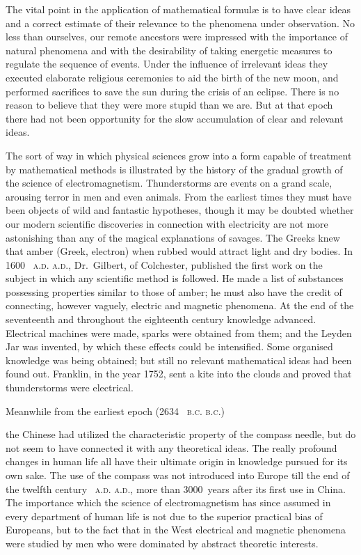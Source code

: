 \documentclass[12pt,leqno]{book}[2005/09/16]
\makeatletter
\newcommand{\PageSep}[1]{\ignorespaces}
\newcommand{\SCAbbrev}[3]{%
  \ifthenelse{\equal{#3}{.}}%
  {\textsc{\MakeLowercase{#1.#2}.}}%
  {\textsc{\MakeLowercase{#1.#2}.}\@#3}%
}
\newcommand{\AD}[1]{\SCAbbrev{A}{D}{#1}}
\newcommand{\BC}[1]{\SCAbbrev{B}{C}{#1}}
\makeatother
\begin{document}
The vital point in the application of mathematical
formulæ is to have clear ideas and a
correct estimate of their relevance to the
phenomena under observation. No less than
ourselves, our remote ancestors were impressed
with the importance of natural
phenomena and with the desirability of taking
energetic measures to regulate the sequence
of events. Under the influence of irrelevant
ideas they executed elaborate religious ceremonies
to aid the birth of the new moon, and
performed sacrifices to save the sun during
the crisis of an eclipse. There is no reason to
believe that they were more stupid than we
are. But at that epoch there had not been
opportunity for the slow accumulation of
clear and relevant ideas.

The sort of way in which physical sciences
%
grow into a form capable of treatment by
mathematical methods is illustrated by the
history of the gradual growth of the science
of electromagnetism. Thunderstorms are
events on a grand scale, arousing terror in
men and even animals. From the earliest
times they must have been objects of wild
\PageSep{32}
%
and fantastic hypotheses, though it may be
doubted whether our modern scientific discoveries
in connection with electricity are not
more astonishing than any of the magical
explanations of savages. The Greeks knew
that amber (Greek, electron) when rubbed
would attract light and dry bodies. In
1600~\AD, Dr.~Gilbert, of Colchester, published
%
the first work on the subject in which any
scientific method is followed. He made a
list of substances possessing properties similar
to those of amber; he must also have the
credit of connecting, however vaguely, electric
and magnetic phenomena. At the end of the
seventeenth and throughout the eighteenth
century knowledge advanced. Electrical
machines were made, sparks were obtained
from them; and the Leyden Jar was invented,
by which these effects could be intensified.
Some organised knowledge was
being obtained; but still no relevant mathematical
ideas had been found out. Franklin,
%
in the year 1752, sent a kite into the clouds
and proved that thunderstorms were electrical.

Meanwhile from the earliest epoch (2634~\BC)
the Chinese had utilized the characteristic
property of the compass needle, but do not
seem to have connected it with any theoretical
ideas. The really profound changes in human
life all have their ultimate origin in knowledge
\PageSep{33}
pursued for its own sake. The use of the compass
was not introduced into Europe till the end
of the twelfth century~\AD, more than $3000$~years
after its first use in China. The importance
which the science of electromagnetism
has since assumed in every department of
human life is not due to the superior practical
bias of Europeans, but to the fact that in the
West electrical and magnetic phenomena
were studied by men who were dominated by
abstract theoretic interests.
\end{document}
